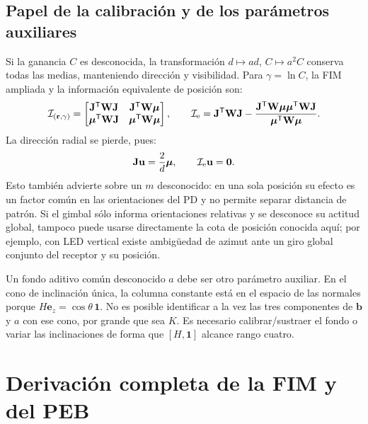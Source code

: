 \documentclass[11pt,a4paper]{article}
\begin{document}
\subsection{Papel de la calibración y de los parámetros auxiliares}
Si la ganancia $C$ es desconocida, la transformación $d\mapsto a d$, $C\mapsto a^2C$ conserva todas las medias, manteniendo dirección y visibilidad. Para $\gamma=\ln C$, la FIM ampliada y la información equivalente de posición son:
\begin{equation}
\mathcal I_{(\mathbf r,\gamma)}=
\begin{bmatrix}\mathbf J^{\mathsf T}\mathbf W\mathbf J&\mathbf J^{\mathsf T}\mathbf W\bm\mu\\
\bm\mu^{\mathsf T}\mathbf W\mathbf J&\bm\mu^{\mathsf T}\mathbf W\bm\mu\end{bmatrix},\qquad
\mathcal I_{\rm e}=\mathbf J^{\mathsf T}\mathbf W\mathbf J-
\frac{\mathbf J^{\mathsf T}\mathbf W\bm\mu\bm\mu^{\mathsf T}\mathbf W\mathbf J}{\bm\mu^{\mathsf T}\mathbf W\bm\mu}.
\label{eq:nuisance}
\end{equation}
La dirección radial se pierde, pues:
\begin{equation}
\mathbf J\mathbf u=\frac{2}{d}\bm\mu,\qquad \mathcal I_{\rm e}\mathbf u=\mathbf0.
\label{eq:radial_null}
\end{equation}
Esto también advierte sobre un $m$ desconocido: en una sola posición su efecto es un factor común en las orientaciones del PD y no permite separar distancia de patrón. Si el gimbal sólo informa orientaciones relativas y se desconoce su actitud global, tampoco puede usarse directamente la cota de posición conocida aquí; por ejemplo, con LED vertical existe ambigüedad de azimut ante un giro global conjunto del receptor y su posición.

Un fondo aditivo común desconocido $a$ debe ser otro parámetro auxiliar. En el cono de inclinación única, la columna constante está en el espacio de las normales porque $H\mathbf e_z=\cos\theta\,\mathbf1$. No es posible identificar a la vez las tres componentes de $\mathbf b$ y $a$ con ese cono, por grande que sea $K$. Es necesario calibrar/sustraer el fondo o variar las inclinaciones de forma que $[H,\mathbf1]$ alcance rango cuatro.

\section{Derivación completa de la FIM y del PEB}
\end{document}
